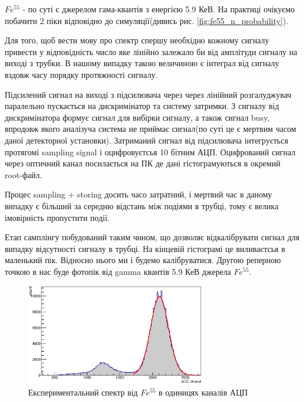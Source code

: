 \documentclass[pdftex,14pt]{scrartcl}
\begin{document}
	
	
	
	
	$Fe^{55}$ - по суті є джерелом гама-квантів з енергією 5.9 КеВ. На практиці  очікуємо побачити 2 піки відповідно до симуляції(дивись рис. \ref{fig:fe55_n_probability}).
	
	Для того, щоб вести мову про спектр спершу необхідно кожному сигналу привести у відповідність число яке лінійно залежало би від амплітуди сигналу на виході з трубки. В нашому випадку такою величиною є інтеграл від сигналу вздовж часу порядку протяжності сигналу.
	
	Підсилений сигнал на виході з підсилювача через через лінійний розгалуджувач  паралельно пускається на дискримінатор та систему затримки. З сигналу від дискримінатора формує сигнал для вибірки сигналу, а також сигнал busy, впродовж якого аналізуча система не приймає сигнал(по суті це є мертвим часом даної детекторної установки). Затриманий сигнал від підсилювача інтегрується протягомі sampling signal і оцифровуєтсья 10 бітним АЦП. Оцифрований сигнал через оптичний канал посилається на ПК де дані гістограмуються в окремий root-файл.
	
	Процес sampling + storing досить часо затратний, і мертвий час в даному випадку є більший за середню відстань між подіями в трубці, тому є велика імовірність пропустити події.
	
	Етап самплінгу побудований таким чином, що дозволяє відкалібрувати сигнал для випадку відсутності сигналу в трубці. На кінцевій гістограмі це виливаєтсья в маленький пік. Відносно нього ми і будемо калібруватися. Другою реперною точкою в нас буде фотопік від gamma квантів 5.9 КеВ джерела $Fe^{55}$.
	
	\begin{figure}
	\centering
	\includegraphics[width=0.7\textwidth]{expFitted1750}
	\caption{ Експериментальний спектр від $Fe^{55}$ в одиницях каналів АЦП}
	\label{fig:expFitted1750}
	\end{figure}
	
\end{document}
